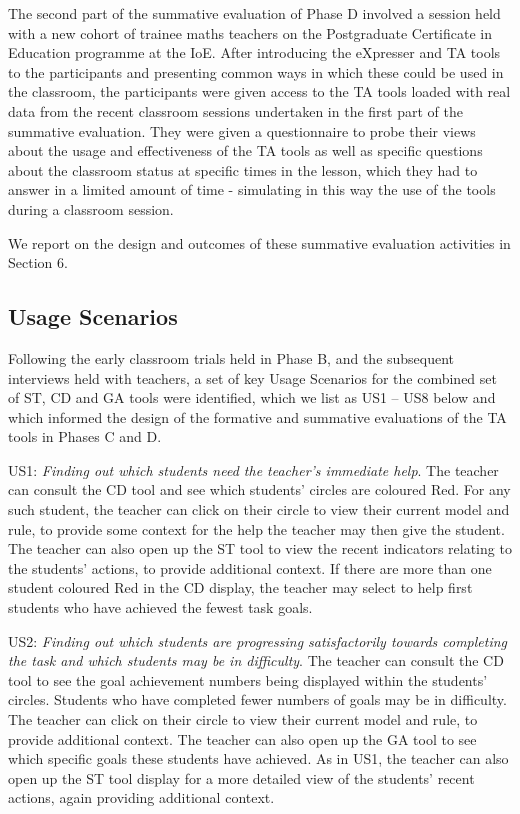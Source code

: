The second part of the summative evaluation of Phase D involved a
session held with a new cohort of trainee maths teachers on the
Postgraduate Certificate in Education programme at the IoE. After
introducing the eXpresser and TA tools to the participants and
presenting common ways in which these could be used in the classroom,
the participants were given access to the TA tools loaded with real
data from the recent classroom sessions undertaken in the first part
of the summative evaluation. They were given a questionnaire to probe
their views about the usage and effectiveness of the TA tools as well
as specific questions about the classroom status at specific times in
the lesson, which they had to answer in a limited amount of time -
simulating in this way the use of the tools during a classroom
session.
 
We report on the design and outcomes of these summative evaluation
activities in Section 6.

\subsection{Usage Scenarios}
\label{sec:usage-scenarios}

Following the early classroom trials held in Phase B, and the
subsequent interviews held with teachers, a set of key Usage Scenarios
for the combined set of ST, CD and GA tools were identified, which we
list as US1 – US8 below and which informed the design of the formative
and summative evaluations of the TA tools in Phases C and D.
 
US1: {\em Finding out which students need the teacher’s immediate
  help}. The teacher can consult the CD tool and see which students’
circles are coloured Red. For any such student, the teacher can click
on their circle to view their current model and rule, to provide some
context for the help the teacher may then give the student. The
teacher can also open up the ST tool to view the recent indicators
relating to the students’ actions, to provide additional context. If
there are more than one student coloured Red in the CD display, the
teacher may select to help first students who have achieved the fewest
task goals.
 
US2: {\em Finding out which students are progressing satisfactorily
  towards completing the task and which students may be in
  difficulty}. The teacher can consult the CD tool to see the goal
achievement numbers being displayed within the students’
circles. Students who have completed fewer numbers of goals may be in
difficulty. The teacher can click on their circle to view their
current model and rule, to provide additional context. The teacher can
also open up the GA tool to see which specific goals these students
have achieved. As in US1, the teacher can also open up the ST tool
display for a more detailed view of the students’ recent actions,
again providing additional context.

